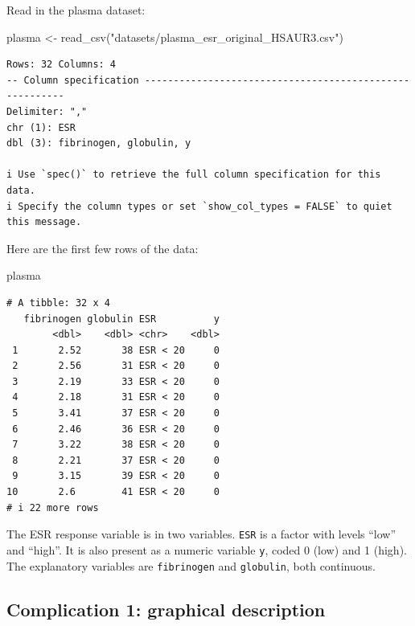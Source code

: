 \documentclass[
  letterpaper,
  8pt,
  a4paper]{book}
\newenvironment{Shaded}{\begin{snugshade}}{\end{snugshade}}
\newcommand{\FunctionTok}[1]{\textcolor[rgb]{0.28,0.35,0.67}{#1}}
\newcommand{\NormalTok}[1]{\textcolor[rgb]{0.00,0.23,0.31}{#1}}
\newcommand{\OtherTok}[1]{\textcolor[rgb]{0.00,0.23,0.31}{#1}}
\newcommand{\StringTok}[1]{\textcolor[rgb]{0.13,0.47,0.30}{#1}}
\begin{document}
Read in the plasma dataset:

\begin{Shaded}
\begin{Highlighting}[]
\NormalTok{plasma }\OtherTok{\textless{}{-}} \FunctionTok{read\_csv}\NormalTok{(}\StringTok{"datasets/plasma\_esr\_original\_HSAUR3.csv"}\NormalTok{)}
\end{Highlighting}
\end{Shaded}

\begin{verbatim}
Rows: 32 Columns: 4
-- Column specification --------------------------------------------------------
Delimiter: ","
chr (1): ESR
dbl (3): fibrinogen, globulin, y

i Use `spec()` to retrieve the full column specification for this data.
i Specify the column types or set `show_col_types = FALSE` to quiet this message.
\end{verbatim}

Here are the first few rows of the data:

\begin{Shaded}
\begin{Highlighting}[]
\NormalTok{plasma}
\end{Highlighting}
\end{Shaded}

\begin{verbatim}
# A tibble: 32 x 4
   fibrinogen globulin ESR          y
        <dbl>    <dbl> <chr>    <dbl>
 1       2.52       38 ESR < 20     0
 2       2.56       31 ESR < 20     0
 3       2.19       33 ESR < 20     0
 4       2.18       31 ESR < 20     0
 5       3.41       37 ESR < 20     0
 6       2.46       36 ESR < 20     0
 7       3.22       38 ESR < 20     0
 8       2.21       37 ESR < 20     0
 9       3.15       39 ESR < 20     0
10       2.6        41 ESR < 20     0
# i 22 more rows
\end{verbatim}

The ESR response variable is in two variables. \texttt{ESR} is a factor
with levels ``low'' and ``high''. It is also present as a numeric
variable \texttt{y}, coded 0 (low) and 1 (high). The explanatory
variables are \texttt{fibrinogen} and \texttt{globulin}, both
continuous.

\subsection*{Complication 1: graphical
description}\label{complication-1-graphical-description}
\end{document}
